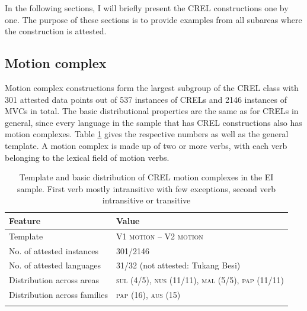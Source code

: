 In the following sections, I will briefly present the CREL constructions one by one. The purpose of these sections is to provide examples from all subareas where the construction is attested.

\subsection{Motion complex} \label{sec:motioncomplex}

Motion complex constructions form the largest subgroup of the CREL class with 301 attested data points out of 537 instances of CRELs and 2146 instances of MVCs in total. The basic distributional properties are the same as for CRELs in general, since every language in the sample that has CREL constructions also has motion complexes. Table \ref{table:basiccrelmotion} gives the respective numbers as well as the general template. A motion complex is made up of two or more verbs, with each verb belonging to the lexical field of motion verbs.

\begin{table}
\begin{tabular}{ll}
\lsptoprule
Feature&Value\tabularnewline
\midrule
Template&V1 \textsc{motion} -- V2 \textsc{motion}\tabularnewline
No. of attested instances& 301/2146 \tabularnewline
No. of attested languages& 31/32 (not attested: Tukang Besi) \tabularnewline
Distribution across areas& \textsc{sul} (4/5), \textsc{nus} (11/11), \textsc{mal} (5/5), \textsc{pap} (11/11) \tabularnewline
Distribution across families& \textsc{pap} (16), \textsc{aus} (15) \tabularnewline
\lspbottomrule
\end{tabular}
\caption[Template and basic distribution of CREL motion complexes]{Template and basic distribution of CREL motion complexes in the EI sample. First verb mostly intransitive with few exceptions, second verb intransitive or transitive}
\label{table:basiccrelmotion}
\end{table}

